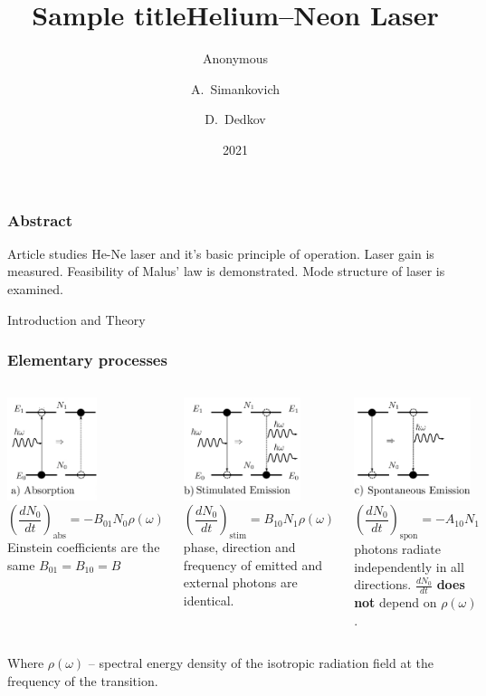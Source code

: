 \documentclass{beamer}
\title{Sample title}
\author{Anonymous}
\institute{Overleaf}
\date{2021}
\title[About Beamer] %
{Helium–Neon Laser}
\author[Arthur, Doe] %
{A.~Simankovich \and D.~Dedkov }
\institute[VFU] %
{
	Moscow Institute of Physics and Technology
}
\date[VLC 2023] %
\begin{document}
	
	\frame{\titlepage}
	
	\begin{frame}
		\frametitle{Abstract}
		
		Article studies He-Ne laser and it's basic principle of operation. Laser gain is measured. Feasibility of Malus' law is demonstrated. Mode structure of laser is examined.

	\end{frame}


	\begin{frame}[plain,c]
		
		\begin{center}
			\huge {} Introduction and Theory
		\end{center}
	
	\end{frame}
	
	
	\begin{frame}
		\frametitle{Elementary processes}
		
		\begin{columns}[t]
			\footnotesize
			
			\includegraphics[height=3cm]{res/emission_types_1.jpg}
			$$\left(\frac{dN_0}{dt}\right)_{\text{abs}} = - B_{01} N_0 \rho(\omega)$$
			Einstein coefficients are the same $B_{01} = B_{10} = B$ 

			\includegraphics[height=3cm]{res/emission_types_2.jpg}
			$$\left(\frac{dN_0}{dt}\right)_{\text{stim}} = B_{10} N_1 \rho(\omega)$$
			phase, direction and frequency of emitted and external photons are identical.
		
			\includegraphics[height=3cm]{res/emission_types_3.jpg}
			$$\left(\frac{dN_0}{dt}\right)_{\text{spon}} = - A_{10} N_1$$
			photons radiate independently in all directions. $\frac{dN_0}{dt}$ \textbf{does not} depend on $\rho(\omega)$.
		\end{columns}
		
		\vspace{10pt}
		\footnotesize
		Where $\rho(\omega)$ -- spectral energy density of the isotropic radiation field at the frequency of the transition.
	\end{frame}
\end{document}
